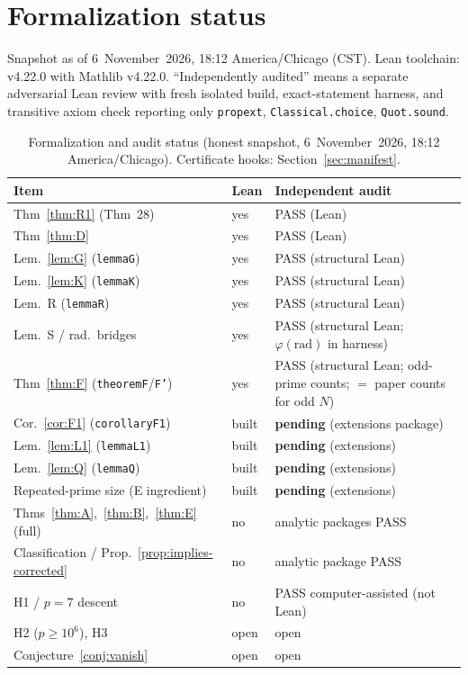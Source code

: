 \documentclass[11pt,reqno]{amsart}
\newcommand{\ph}{\varphi}
\theoremstyle{definition}
\begin{document}
\section{Formalization status}
\label{sec:formalization}

Snapshot as of 6~November~2026, 18:12 America/Chicago (CST). Lean toolchain: v4.22.0 with Mathlib v4.22.0. ``Independently audited'' means a separate adversarial Lean review with fresh isolated build, exact-statement harness, and transitive axiom check reporting only \texttt{propext}, \texttt{Classical.choice}, \texttt{Quot.sound}.

\begin{table}[ht]
\centering
\caption{Formalization and audit status (honest snapshot, 6~November~2026, 18:12 America/Chicago). Certificate hooks: Section~\ref{sec:manifest}.}
\label{tab:formalization}
{\footnotesize
\begin{tabular}{@{}p{4.1cm}p{1.6cm}p{5.6cm}@{}}
\toprule
Item & Lean & Independent audit \\
\midrule
Thm~\ref{thm:R1} (Thm~28) & yes & PASS (Lean) \\
Thm~\ref{thm:D} & yes & PASS (Lean) \\
Lem.~\ref{lem:G} (\texttt{lemmaG}) & yes & PASS (structural Lean) \\
Lem.~\ref{lem:K} (\texttt{lemmaK}) & yes & PASS (structural Lean) \\
Lem.~R (\texttt{lemmaR}) & yes & PASS (structural Lean) \\
Lem.~S / rad.\ bridges & yes & PASS (structural Lean; \(\ph(\mathrm{rad})\) in harness) \\
Thm~\ref{thm:F} (\texttt{theoremF}/\texttt{F'}) & yes & PASS (structural Lean; odd-prime counts; \(=\) paper counts for odd \(N\)) \\
Cor.~\ref{cor:F1} (\texttt{corollaryF1}) & built & \textbf{pending} (extensions package) \\
Lem.~\ref{lem:L1} (\texttt{lemmaL1}) & built & \textbf{pending} (extensions) \\
Lem.~\ref{lem:Q} (\texttt{lemmaQ}) & built & \textbf{pending} (extensions) \\
Repeated-prime size (E ingredient) & built & \textbf{pending} (extensions) \\
Thms~\ref{thm:A},~\ref{thm:B},~\ref{thm:E} (full) & no & analytic packages PASS \\
Classification / Prop.~\ref{prop:implies-corrected} & no & analytic package PASS \\
H1 / \(p=7\) descent & no & PASS computer-assisted (not Lean) \\
H2 (\(p\ge 10^6\)), H3 & open & open \\
Conjecture~\ref{conj:vanish} & open & open \\
\bottomrule
\end{tabular}
}
\end{table}
\end{document}
